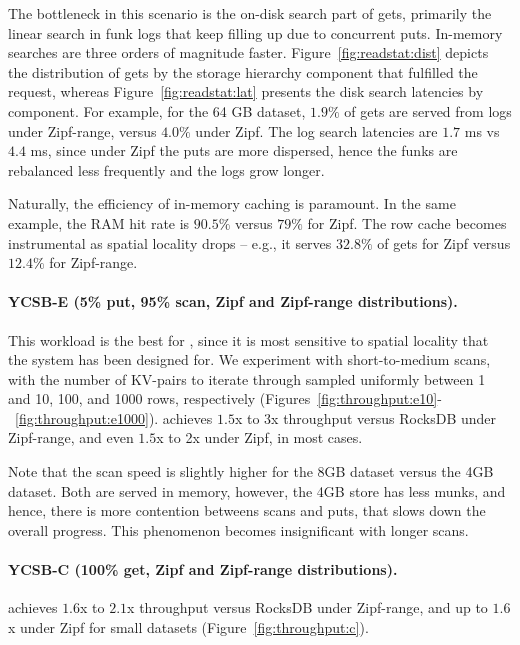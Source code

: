 The bottleneck in this scenario is the on-disk search part of gets, primarily the linear search in funk logs 
that keep filling up due to concurrent puts. In-memory searches are three orders of magnitude 
faster. Figure~\ref{fig:readstat:dist} depicts the distribution of gets by the storage hierarchy component 
that fulfilled the request, whereas Figure~\ref{fig:readstat:lat} presents the disk search latencies by component. 
For example, for the 64 GB dataset, $1.9\%$ of gets are served from logs under Zipf-range, versus $4.0\%$ under Zipf. 
The log search latencies are $1.7$ ms vs $4.4$ ms, since under Zipf the puts are more dispersed, hence the funks are rebalanced less frequently and the logs grow longer. 


Naturally, the efficiency of in-memory caching is paramount. In the same example, the RAM hit rate is 
$90.5\%$ versus $79\%$ for Zipf. The row cache becomes instrumental as spatial locality drops --
e.g., it serves $32.8\%$ of gets for Zipf versus $12.4\%$ for Zipf-range. 

\paragraph{YCSB-E (5\% put, 95\% scan, Zipf and Zipf-range distributions).}
This workload is the best for \sys, since it is most sensitive to spatial locality
that the system has been designed for. 
We experiment with short-to-medium scans, with the number of KV-pairs to iterate through 
sampled uniformly between 1 and 10, 100, and 1000 rows, respectively (Figures~\ref{fig:throughput:e10}-~\ref{fig:throughput:e1000}). \sys\/ achieves $1.5$x to $3$x throughput versus RocksDB under
Zipf-range, and even $1.5$x to 2x under Zipf, in most cases. 

Note that the scan speed is slightly higher for the 8GB dataset versus the 4GB dataset. 
Both are served in memory, however, the 4GB store has less munks, and hence, there is more contention 
betweens scans and puts, that slows down the overall progress. This phenomenon becomes insignificant 
with longer scans. 

\paragraph{YCSB-C (100\% get, Zipf and Zipf-range distributions).}  
\sys\/ achieves $1.6$x to $2.1$x throughput versus RocksDB under Zipf-range,
and up to $1.6$x under Zipf for small datasets (Figure~\ref{fig:throughput:c}).   

